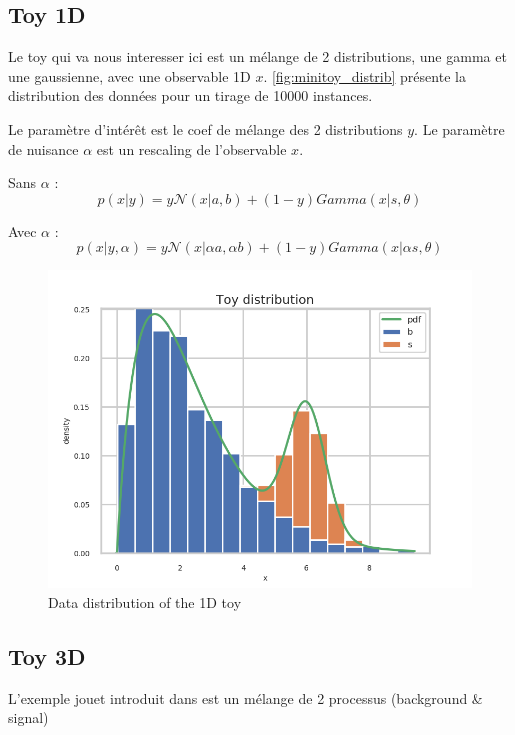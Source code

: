 \subsection{Toy 1D} %
\label{sub:toy_1d}

Le toy qui va nous interesser ici est un mélange de 2 distributions, une gamma et une gaussienne, avec une observable 1D $x$.
\autoref{fig:minitoy_distrib} présente la distribution des données pour un tirage de 10000 instances.

Le paramètre d'intérêt est le coef de mélange des 2 distributions $y$.
Le paramètre de nuisance $\alpha$ est un rescaling de l'observable $x$.

Sans $\alpha$ :
$$
    p(x | y) = y \mathcal N(x|a, b) + (1-y) Gamma(x|s, \theta)
$$

Avec $\alpha$ :
$$
    p(x | y, \alpha) = y \mathcal N(x|\alpha a, \alpha b) + (1-y) Gamma(x|\alpha s, \theta)
$$

\begin{figure}[htb]
    \includegraphics[width=\linewidth]{minitoy/distrib.png}
    \caption{Data distribution of the 1D toy}
    \label{fig:minitoy_distrib}
\end{figure}



\subsection{Toy 3D} %
\label{sub:toy_3d}


L'exemple jouet introduit dans \cite{DECASTRO2019170inferno} est un mélange de 2 processus (background \& signal)


